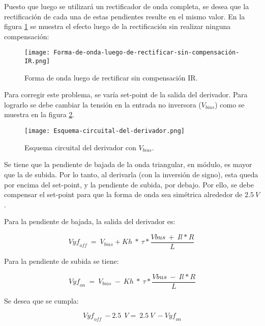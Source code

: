 \noindent Puesto que luego se utilizar\'{a} un rectificador de onda completa, se desea que la rectificaci\'{o}n de cada una de estas pendientes resulte en el mismo valor. En la figura \ref{fig:img_Forma-de-onda-luego-de-rectificar-sin-compensación-IR} se muestra el efecto luego de la rectificaci\'{o}n sin realizar ninguna compensaci\'{o}n:

\begin{figure}[H]
	\centering
	\texttt{[image: Forma-de-onda-luego-de-rectificar-sin-compensación-IR.png]}
	\caption{Forma de onda luego de rectificar sin compensación IR.}
	\label{fig:img_Forma-de-onda-luego-de-rectificar-sin-compensación-IR}
\end{figure}

\noindent Para corregir este problema, se varía set-point de la salida del derivador. Para lograrlo se debe cambiar la tensi\'{o}n en la entrada no inversora ($V_{bias}$) como se muestra en la figura \ref{fig:img_Esquema-circuital-del-derivador}. 

\begin{figure}[H]
	\centering
	\texttt{[image: Esquema-circuital-del-derivador.png]}
	\caption{Esquema circuital del derivador con $V_{bias}$.}
	\label{fig:img_Esquema-circuital-del-derivador}
\end{figure}

\noindent Se tiene que la pendiente de bajada de la onda triangular, en m\'{o}dulo, es mayor que la de subida. Por lo tanto, al derivarla (con la inversi\'{o}n de signo), esta queda por encima del set-point, y la pendiente de subida, por debajo. Por ello, se debe compensar el set-point para que la forma de onda sea sim\'{e}trica alrededor de $2.5\:V$. 

\noindent Para la pendiente de bajada, la salida del derivador es:

\begin{equation} \label{eq_Vyf-Vbias}
	{Vyf}_{off}\ =\ V_{bias}+Kh\ *\ \tau *\frac{Vbus\ +\ Il*R}{L}\ 
\end{equation}

\noindent Para la pendiente de subida se tiene:

\begin{equation} \label{eq_Vyf-Vbias2}
	{Vyf}_{on}\ =\ V_{bias}\ -\ Kh\ *\ \tau *\frac{Vbus\ -\ Il*R}{L}
\end{equation}

\noindent Se desea que se cumpla:

\begin{equation} \label{eq_Vyf_Vbias3}
	{Vyf}_{off}\ -2.5\ \:V=\ 2.5\ V\ -{Vyf}_{on}
\end{equation}

